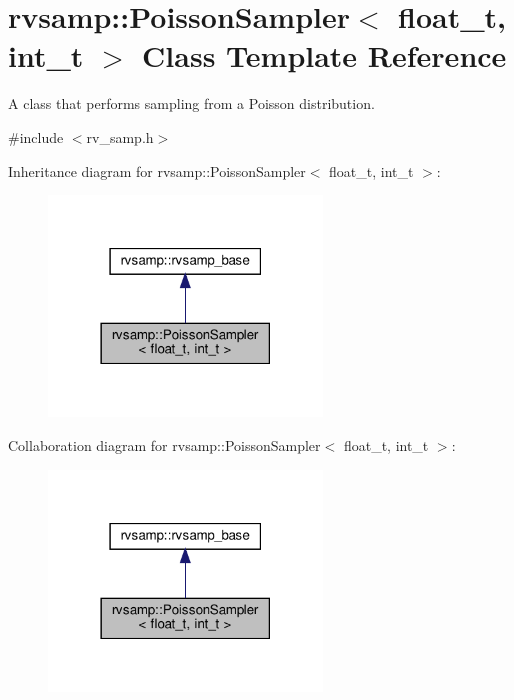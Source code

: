 \hypertarget{classrvsamp_1_1PoissonSampler}{}\section{rvsamp\+:\+:Poisson\+Sampler$<$ float\+\_\+t, int\+\_\+t $>$ Class Template Reference}
\label{classrvsamp_1_1PoissonSampler}


A class that performs sampling from a Poisson distribution.  




{\ttfamily \#include $<$rv\+\_\+samp.\+h$>$}



Inheritance diagram for rvsamp\+:\+:Poisson\+Sampler$<$ float\+\_\+t, int\+\_\+t $>$\+:\nopagebreak
\begin{figure}[H]
\begin{center}
\leavevmode
\includegraphics[width=206pt]{classrvsamp_1_1PoissonSampler__inherit__graph}
\end{center}
\end{figure}


Collaboration diagram for rvsamp\+:\+:Poisson\+Sampler$<$ float\+\_\+t, int\+\_\+t $>$\+:\nopagebreak
\begin{figure}[H]
\begin{center}
\leavevmode
\includegraphics[width=206pt]{classrvsamp_1_1PoissonSampler__coll__graph}
\end{center}
\end{figure}
